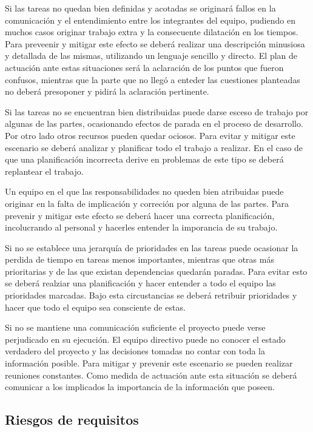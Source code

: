 Si las tareas no quedan bien definidas y acotadas se originará fallos en la comunicación y el entendimiento entre
los integrantes del equipo, pudiendo en muchos casos originar trabajo extra y la consecuente dilatación en los tiempos. 
Para preveenir y mitigar este efecto se deberá realizar una descripción minusiosa y detallada de las mismas, utilizando un lenguaje 
sencillo y directo. El plan de actuación ante estas situaciones será la aclaración de los puntos que fueron confusos, mientras que la parte 
que no llegó a enteder las cuestiones planteadas no deberá presoponer y pidirá la aclaración pertinente. 

Si las tareas no se encuentran bien distribuidas puede darse esceso de trabajo por algunas de las partes, ocasionando efectos de parada en el 
proceso de desarrollo. Por otro lado otros recursos pueden quedar ociosos. Para evitar y mitigar este escenario se deberá analizar y planificar todo 
el trabajo a realizar. En el caso de que una planificación incorrecta derive en problemas de este tipo se deberá replantear el trabajo.

Un equipo en el que las responsabilidades no queden bien atribuidas puede originar en la falta de implicación y correción por alguna de 
las partes. Para prevenir y mitigar este efecto se deberá hacer una correcta planificación, incolucrando al personal y hacerles entender la imporancia de su trabajo. 

Si no se establece una jerarquía de prioridades en las tareas puede ocasionar la perdida de tiempo en tareas menos importantes, mientras que otras más prioritarias y de las que
existan dependencias quedarán paradas. 
Para evitar esto se deberá realziar una planificación y hacer entender a todo el equipo las prioridades marcadas. Bajo esta circustancias se deberá retribuir prioridades 
y hacer que todo el equipo sea consciente de estas.

Si no se mantiene una comunicación suficiente el proyecto puede verse perjudicado en su ejecución. El equipo directivo puede no conocer el estado verdadero del proyecto 
y las decisiones tomadas no contar con toda la información posible. Para mitigar y prevenir este escenario se pueden realizar reuniones constantes. Como medida de actuación ante 
esta situación se deberá comunicar a los implicados la importancia de la información que poseen.

\subsection{Riesgos de requisitos}

